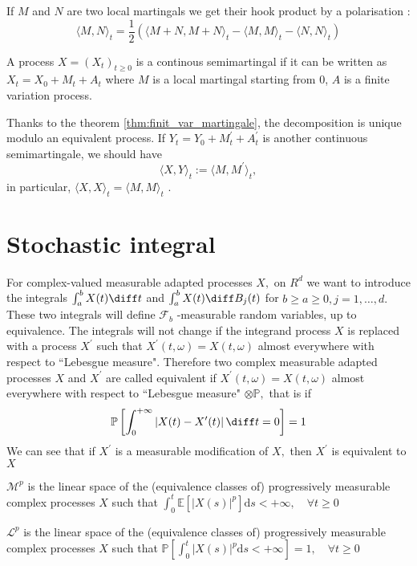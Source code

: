 	If $M$ and $N$ are two local martingals we get their hook product by a polarisation :
	$$
	\langle M, N\rangle_{t}=\frac{1}{2}\left(\langle M+N, M+N\rangle_{t}-\langle M, M\rangle_{t}-\langle N, N\rangle_{t}\right)
	$$
	\begin{definition}
		A process $X=\left(X_{t}\right)_{t \geq 0}$ is a continous semimartingal if it can be written as $X_{t}=X_{0}+M_{t}+A_{t}$ where $M$ is a local martingal starting from $0$, $A$ is a finite variation process.
	\end{definition}
	Thanks to the theorem \eqref{thm:finit_var_martingale}, the decomposition is unique modulo an equivalent process. If $Y_{t}=Y_{0}+M_{t}^{\prime}+A_{t}^{\prime}$ is another continuous semimartingale, we should have
\[ 	\langle X, Y \rangle_{t}:= \langle M, M^{\prime}\rangle_{t}, \]
	in particular, $\langle X, X \rangle_{t}= \langle M, M \rangle_{t}$
	.
\section{Stochastic integral}
	For complex-valued measurable adapted processes $X,$ on $R^d$ we want to introduce the integrals $\int_{a}^{b} X(t) \diff t$ and $\int_{a}^{b} X(t) \diff B_{j}(t)$ for $b \geq a \geq 0, j=1, \ldots, d .$ These
	two integrals will define $\mathcal{F}_{b}$ -measurable random variables, up to equivalence. The integrals will not change if the integrand process $X$ is replaced with a process $X^{\prime}$ such that $X^{\prime}(t, \omega)=X(t, \omega)$ almost everywhere with respect to ``Lebesgue measure". Therefore two complex measurable adapted processes $X$ and $X^{\prime}$ are called equivalent if $X^{\prime}(t, \omega)=X(t, \omega)$ almost everywhere with respect to ``Lebesgue measure" $\otimes \mathbb{P},$ that is if
	\[
	\mathbb{P}\left[\int_{0}^{+\infty}\left|X(t)-X^{\prime}(t)\right| \diff t=0\right]=1
	\]
	We can see that if $X^{\prime}$ is a measurable modification of $X,$ then $X^{\prime}$ is equivalent to $X$
	\begin{definition}

		$\mathcal{M}^{p}$ is the linear space of the (equivalence classes of) progressively measurable complex processes $X$ such that
		$
		\int_{0}^{t} \mathbb{E}\left[|X(s)|^{p}\right] \mathrm{d} s<+\infty, \quad \forall t \geq 0
		$
	\end{definition}


\begin{definition}

		$\mathcal{L}^{p}$ is the linear space of the (equivalence classes of) progressively measurable complex processes $X$ such that
		$
		\mathbb{P}\left[\int_{0}^{t}|X(s)|^{p} \mathrm{d} s<+\infty\right]=1, \quad \forall t \geq 0
		$

\end{definition}

